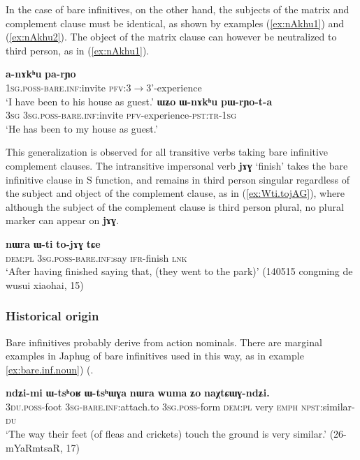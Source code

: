\documentclass[oneside,a4paper,11pt]{article}
\newcommand{\ipa}[1]{\textbf{\phon#1}} %
\newcommand{\jpg}[2]{\ipa{#1} `#2'} %
\begin{document}
In the case of bare infinitives, on the other hand, the subjects of the matrix and complement clause must be identical, as shown by examples (\ref{ex:nAkhu1}) and (\ref{ex:nAkhu2}). The object of the matrix clause can however be neutralized to third person, as in (\ref{ex:nAkhu1}).

\begin{exe}
\ex  \label{ex:nAkhu1}
\gll \ipa{a-nɤkʰu} 	\ipa{pa-rɲo} \\
\textsc{1sg.poss-bare.inf:}invite \textsc{pfv:3$\rightarrow$3'}-experience \\
\glt `I have been to his house as guest.' 
\ex  \label{ex:nAkhu2}
\gll \ipa{ɯʑo} 	\ipa{ɯ-nɤkʰu} 	\ipa{pɯ-rɲo-t-a} \\
\textsc{3sg}  \textsc{3sg.poss-bare.inf:}invite \textsc{pfv}-experience-\textsc{pst:tr-1sg} \\
\glt `He has been to my house as guest.'
\end{exe}

This generalization is observed for all transitive verbs taking bare infinitive complement clauses. The intransitive impersonal verb \jpg{jɤɣ}{finish} takes the bare infinitive clause in S function, and remains in third person singular regardless of the subject and object of the complement clause, as in (\ref{ex:Wti.tojAG}), where although the subject of the complement clause is third person plural, no plural marker can appear on \ipa{jɤɣ}.

\begin{exe}
\ex \label{ex:Wti.tojAG}
\gll \ipa{nɯra} 	\ipa{ɯ-ti} 	\ipa{to-jɤɣ} \ipa{tɕe} \\
\textsc{dem:pl} \textsc{3sg.poss-bare.inf}:say \textsc{ifr}-finish \textsc{lnk}\\
\glt `After having finished saying that, (they went to the park)' (140515 congming de wusui xiaohai, 15)
\end{exe}

\subsubsection{Historical origin}
Bare infinitives probably derive from action nominals. There are marginal examples in Japhug of bare infinitives used in this way, as in example \ref{ex:bare.inf.noun})  (\citealt{jacques14antipassive}.

\begin{exe}
\ex \label{ex:bare.inf.noun}
\gll \ipa{ndʑi-mi}   	\ipa{ɯ-tsʰoʁ}   	\ipa{ɯ-tsʰɯɣa}   	\ipa{nɯra}   	\ipa{wuma}   	\ipa{ʑo}   	\ipa{naχtɕɯɣ-ndʑi.}   \\
\textsc{3du.poss}-foot \textsc{3sg}-\textsc{bare.inf:}attach.to \textsc{3sg.poss}-form \textsc{dem:pl} very \textsc{emph}  \textsc{npst}:similar-\textsc{du}  \\
\glt `The way their feet (of fleas and crickets) touch the ground is very similar.' (26-mYaRmtsaR, 17)
\end{exe}
\end{document}
